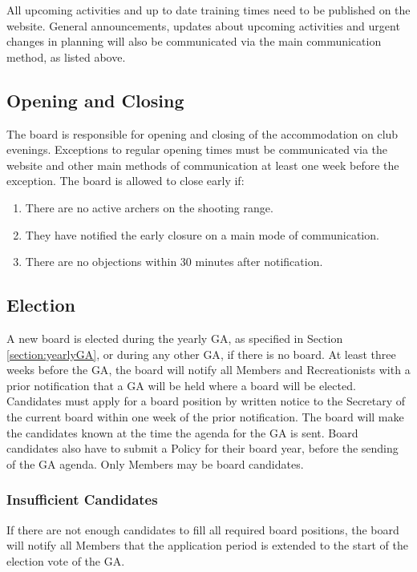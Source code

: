 \documentclass[a4paper]{article}
\begin{document}
All upcoming activities and up to date training times need to be published on the website. 
General announcements, updates about upcoming activities and urgent changes in planning will also be communicated via the main communication method, as listed above.

\subsection{Opening and Closing}
The board is responsible for opening and closing of the { accommodation} on club evenings. Exceptions to regular opening times must be communicated via the website and other main methods of communication at least one week before the exception. The board is allowed to close early if:

\begin{enumerate}
\item There are no active { archers} on the shooting range.
\item They have notified the early closure on a main mode of communication.
\item There are no objections within 30 minutes after notification.
\end{enumerate}



\subsection{Election}
A new board is elected during the yearly { GA}, as specified in Section \ref{section:yearlyGA}, or during any other { GA}, if there is no board. At least three weeks before the { GA}, the board will notify all { Members} and { Recreationists} with a prior notification that a { GA} will be held where a board will be elected. Candidates must apply for a board position by written notice to the Secretary of the current board within one week of the prior notification. The board will make the candidates known at the time the agenda for the { GA} is sent. Board candidates also have to submit a Policy for their board year, before the sending of the { GA} agenda. Only { Members} may be board candidates.

\subsubsection{Insufficient Candidates}

If there are not enough candidates to fill all required board positions, the board will notify all { Members} that the application period is extended to the start of the election vote of the { GA}. \\
\end{document}
